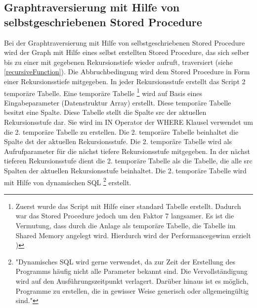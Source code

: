 \subsection{Graphtraversierung mit Hilfe von selbstgeschriebenen Stored Procedure}
\label{postgresRecursiveFunction}
Bei der Graphtraversierung mit Hilfe von selbstgeschriebenen Stored Procedure wird der Graph mit Hilfe eines selbst erstellten Stored Procedure, das sich selber bis
zu einer mit gegebenen Rekursionstiefe wieder aufruft, traversiert (siehe \ref{recursiveFunction}). Die Abbruchbedingung wird dem Stored Procedure in Form einer
Rekursionsstiefe mitgegeben. In jeder Rekursionsstufe erstellt das Script 2 temporäre Tabelle. Eine temporäre Tabelle \footnote{Zuerst wurde das Script mit Hilfe einer standard Tabelle
erstellt. Dadurch war das Stored Procedure jedoch um den Faktor 7 langsamer. Es ist die Vermutung, dass durch die Anlage als temporäre Tabelle, die Tabelle im Shared Memory angelegt wird.
Hierdurch wird der Performancegewinn erzielt  \cite[S.26]{froehlich01})}
wird auf Basis eines Eingabeparameter (Datenstruktur Array) erstellt.
Diese temporäre Tabelle besitzt eine Spalte. Diese Tabelle stellt die Spalte src der aktuellen Rekursionsstufe dar. Sie wird im IN Operator der WHERE Klausel verwendet
um die 2. temporäre Tabelle zu erstellen. Die 2. temporäre Tabelle beinhaltet die Spalte dst der aktuellen Rekursionsstufe. Die 2. temporäre Tabelle wird als
Aufrufparameter für die nächst tiefere Rekursionsstufe mitgegeben. In der nächst tieferen Rekursionsstufe dient die 2. temporäre Tabelle als die Tabelle, die alle
src Spalten der aktuellen Rekursionsstufe beinhaltet. Die 2. temporäre Tabelle wird mit Hilfe von dynamischen \ac{SQL} \footnote{"Dynamisches SQL wird gerne verwendet,
da zur Zeit der Erstellung des Programms häufig nicht alle Parameter bekannt sind. Die Vervollständigung wird auf den Ausführungszeitpunkt verlagert. Darüber hinaus
ist es möglich, Programme zu erstellen, die in gewisser Weise generisch oder allgemeingültig sind."\cite[S.316 - 317]{froehlich01}} erstellt.

